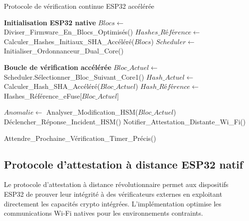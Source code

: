 \begin{algorithm}
\caption{Protocole de vérification continue ESP32 accélérée}
\label{alg:continuous-verification-esp32}
\begin{algorithmic}[1]
\State \textbf{Initialisation ESP32 native}
\State $Blocs \leftarrow$ Diviser\_Firmware\_En\_Blocs\_Optimisés()
\State $Hashes\_Référence \leftarrow$ Calculer\_Hashes\_Initiaux\_SHA\_Accéléré($Blocs$)
\State $Scheduler \leftarrow$ Initialiser\_Ordonnanceur\_Dual\_Core()

\State \textbf{Boucle de vérification accélérée}
    \State $Bloc\_Actuel \leftarrow$ Scheduler.Sélectionner\_Bloc\_Suivant\_Core1()
    \State $Hash\_Actuel \leftarrow$ Calculer\_Hash\_SHA\_Accéléré($Bloc\_Actuel$)
    \State $Hash\_Référence \leftarrow$ Hashes\_Référence\_eFuse[$Bloc\_Actuel$]
    
        \State $Anomalie \leftarrow$ Analyser\_Modification\_HSM($Bloc\_Actuel$)
            \State Déclencher\_Réponse\_Incident\_HSM()
            \State Notifier\_Attestation\_Distante\_Wi\_Fi()
        \EndIf
    \EndIf
    
    \State Attendre\_Prochaine\_Vérification\_Timer\_Précis()
\EndWhile
\end{algorithmic}
\end{algorithm}

\subsection{Protocole d'attestation à distance ESP32 natif}

Le protocole d'attestation à distance révolutionnaire permet aux dispositifs ESP32 de prouver leur intégrité à des vérificateurs externes en exploitant directement les capacités crypto intégrées. L'implémentation optimise les communications Wi-Fi natives pour les environnements contraints.

